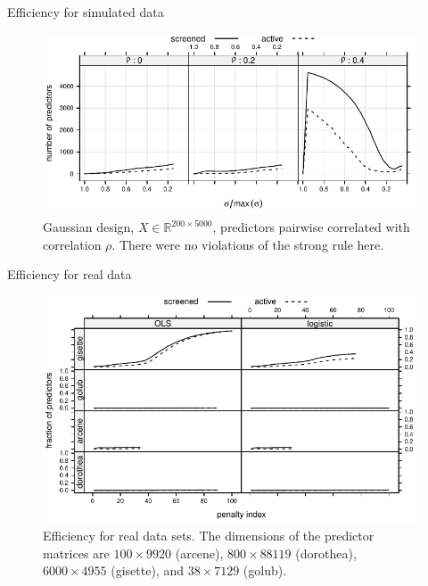 \documentclass[10pt,ignorenonframetext]{beamer}
\begin{document}
\begin{frame}{Efficiency for simulated data}
\begin{figure}
\centering
\includegraphics[width=\linewidth]{figures/gaussian.pdf}
\caption{Gaussian design, \(X \in \mathbb{R}^{200\times 5000}\),
predictors pairwise correlated with correlation \(\rho\). There were no violations of
the strong rule here.}
\end{figure}
\end{frame}

\begin{frame}{Efficiency for real data}
\begin{figure}
\centering
\includegraphics[width=\linewidth]{figures/efficiency-real.pdf}
\caption{Efficiency for real data sets. The dimensions of the predictor matrices
are \(100 \times 9920\) (arcene), \(800\times 88119\) (dorothea), \(6000\times 4955\)
(gisette), and \(38 \times 7129\) (golub).}
\end{figure}
\end{frame}
\end{document}
